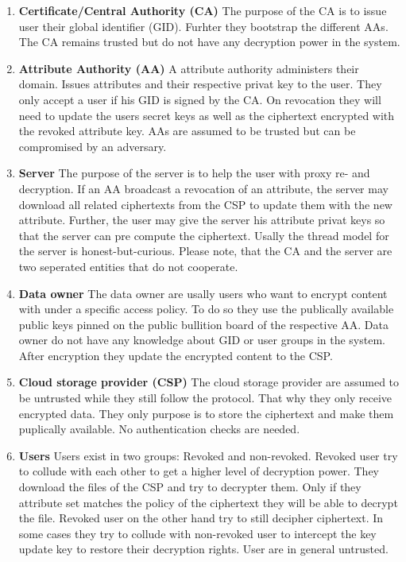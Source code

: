 \begin{enumerate}
	\item \textbf{Certificate/Central Authority (CA)} The purpose of the CA is to issue user their global identifier (GID). Furhter they bootstrap the different AAs. The CA remains trusted but do not have any decryption power in the system. 
	\item \textbf{Attribute Authority (AA)} A attribute authority administers their domain. Issues attributes and their respective privat key to the user. They only accept a user if his GID is signed by the CA. 
	On revocation they will need to update the users secret keys as well as the ciphertext encrypted with the revoked attribute key. AAs are assumed to be trusted but can be compromised by an adversary.
	\item \textbf{Server} The purpose of the server is to help the user with proxy re- and decryption. If an AA broadcast a revocation of an attribute, the server may download all related ciphertexts from the CSP to update them with the new attribute. 
	Further, the user may give the server his attribute privat keys so that the server can pre compute the ciphertext. Usally the thread model for the server is honest-but-curious. Please note, that the CA and the server are two seperated entities that do not cooperate.
	\item \textbf{Data owner} The data owner are usally users who want to encrypt content with under a specific access policy. To do so they use the publically available public keys pinned on the public bullition board of the respective AA. Data owner do not have any knowledge about GID or user groups in the system. After encryption they update the encrypted content to the CSP.
	\item \textbf{Cloud storage provider (CSP)} The cloud storage provider are assumed to be untrusted while they still follow the protocol. That why they only receive encrypted data. They only purpose is to store the ciphertext and make them puplically available. No authentication checks are needed.
	\item \textbf{Users} Users exist in two groups: Revoked and non-revoked. Revoked user try to collude with each other to get a higher level of decryption power. They download the files of the CSP and try to decrypter them. Only if they attribute set matches the policy of the ciphertext they will be able to decrypt the file. 
	Revoked user on the other hand try to still decipher ciphertext. In some cases they try to collude with non-revoked user to intercept the key update key to restore their decryption rights. 
	User are in general untrusted.
\end{enumerate} 